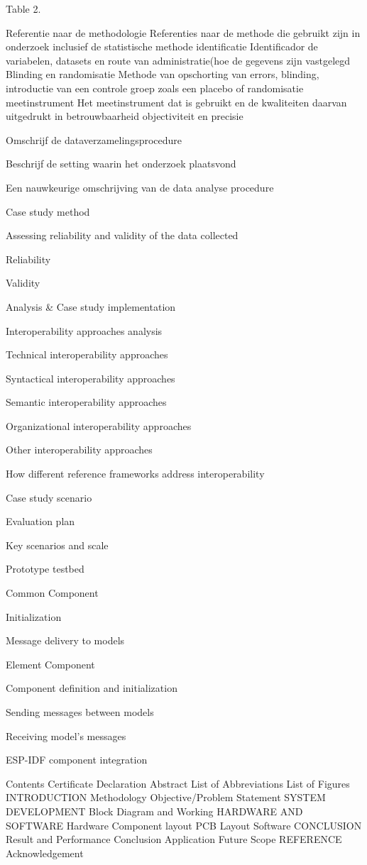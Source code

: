 Table 2. 



Referentie naar de methodologie
Referenties naar de methode die gebruikt zijn in onderzoek inclusief de statistische methode
identificatie
Identificador de variabelen, datasets en route van administratie(hoe de gegevens zijn vastgelegd
Blinding en randomisatie
Methode van opschorting van errors, blinding, introductie van een controle groep zoals een placebo of randomisatie
meetinstrument
Het meetinstrument dat is gebruikt en de kwaliteiten daarvan uitgedrukt in betrouwbaarheid objectiviteit en precisie

Omschrijf de dataverzamelingsprocedure

Beschrijf de setting waarin het onderzoek plaatsvond


Een nauwkeurige omschrijving van de data analyse procedure


Case study method

 

Assessing reliability and validity of the data collected

Reliability

Validity

Analysis & Case study implementation

Interoperability approaches analysis

Technical interoperability approaches

Syntactical interoperability approaches

Semantic interoperability approaches

Organizational interoperability approaches

Other interoperability approaches

How different reference frameworks address interoperability

Case study scenario

Evaluation plan

Key scenarios and scale

Prototype testbed

Common Component

Initialization

Message delivery to models 

Element Component 

Component definition and initialization

Sending messages between models 

Receiving model’s messages

ESP-IDF component integration


Contents
Certificate 
Declaration  
Abstract  
List of Abbreviations  
List of Figures 
INTRODUCTION  
Methodology 
Objective/Problem Statement  
SYSTEM DEVELOPMENT 
Block Diagram and Working  
HARDWARE AND SOFTWARE 
Hardware 
Component layout  
PCB Layout  
Software  
CONCLUSION  
Result and Performance  
Conclusion  
Application 
Future Scope  
REFERENCE  
Acknowledgement  